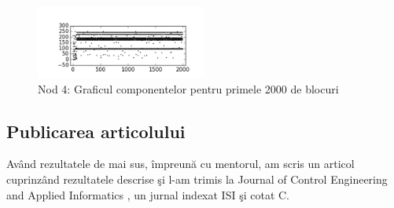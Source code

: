 \documentclass{llncs}
\begin{document}
\begin{figure}
\begin{center}
\includegraphics[width=0.5\textwidth]{img/carouri_db4.png}    %
\caption{Nod 4: Graficul componentelor pentru primele 2000 de blocuri} 
\label{fig:carouri_db4}
\end{center}
\end{figure}

\subsection{Publicarea articolului}

Av\^{a}nd rezultatele de mai sus, \^{i}mpreun\u{a} cu mentorul, am scris un articol cuprinz\^{a}nd rezultatele descrise \c{s}i l-am trimis la Journal of Control Engineering and Applied Informatics \cite{Ceai:2015}, un jurnal indexat ISI \c{s}i cotat C.
%
%
%
\clearpage


\end{document}
